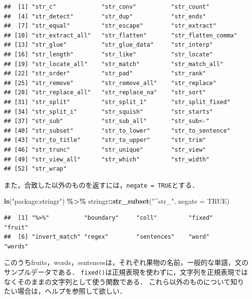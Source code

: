 \documentclass[
]{article}
\newenvironment{Shaded}{\begin{snugshade}}{\end{snugshade}}
\newcommand{\AttributeTok}[1]{\textcolor[rgb]{0.13,0.29,0.53}{#1}}
\newcommand{\ConstantTok}[1]{\textcolor[rgb]{0.56,0.35,0.01}{#1}}
\newcommand{\FunctionTok}[1]{\textcolor[rgb]{0.13,0.29,0.53}{\textbf{#1}}}
\newcommand{\NormalTok}[1]{#1}
\newcommand{\SpecialCharTok}[1]{\textcolor[rgb]{0.81,0.36,0.00}{\textbf{#1}}}
\newcommand{\StringTok}[1]{\textcolor[rgb]{0.31,0.60,0.02}{#1}}
\begin{document}
\begin{verbatim}
##  [1] "str_c"             "str_conv"          "str_count"        
##  [4] "str_detect"        "str_dup"           "str_ends"         
##  [7] "str_equal"         "str_escape"        "str_extract"      
## [10] "str_extract_all"   "str_flatten"       "str_flatten_comma"
## [13] "str_glue"          "str_glue_data"     "str_interp"       
## [16] "str_length"        "str_like"          "str_locate"       
## [19] "str_locate_all"    "str_match"         "str_match_all"    
## [22] "str_order"         "str_pad"           "str_rank"         
## [25] "str_remove"        "str_remove_all"    "str_replace"      
## [28] "str_replace_all"   "str_replace_na"    "str_sort"         
## [31] "str_split"         "str_split_1"       "str_split_fixed"  
## [34] "str_split_i"       "str_squish"        "str_starts"       
## [37] "str_sub"           "str_sub_all"       "str_sub<-"        
## [40] "str_subset"        "str_to_lower"      "str_to_sentence"  
## [43] "str_to_title"      "str_to_upper"      "str_trim"         
## [46] "str_trunc"         "str_unique"        "str_view"         
## [49] "str_view_all"      "str_which"         "str_width"        
## [52] "str_wrap"
\end{verbatim}

また，合致した以外のものを返すには，\texttt{negate\ =\ TRUE}とする．

\begin{Shaded}
\begin{Highlighting}[]
\FunctionTok{ls}\NormalTok{(}\StringTok{"package:stringr"}\NormalTok{) }\SpecialCharTok{\%\textgreater{}\%}
\NormalTok{  stringr}\SpecialCharTok{::}\FunctionTok{str\_subset}\NormalTok{(}\StringTok{"\^{}str\_"}\NormalTok{, }\AttributeTok{negate =} \ConstantTok{TRUE}\NormalTok{)}
\end{Highlighting}
\end{Shaded}

\begin{verbatim}
##  [1] "%>%"          "boundary"     "coll"         "fixed"        "fruit"       
##  [6] "invert_match" "regex"        "sentences"    "word"         "words"
\end{verbatim}

このうちfruits，words，sentencesは，それぞれ果物の名前，一般的な単語，文のサンプルデータである．
\texttt{fixed()}は正規表現を使わずに，文字列を正規表現ではなくそのままの文字列として使う関数である．
これら以外のものについて知りたい場合は，ヘルプを参照して欲しい．
\end{document}
